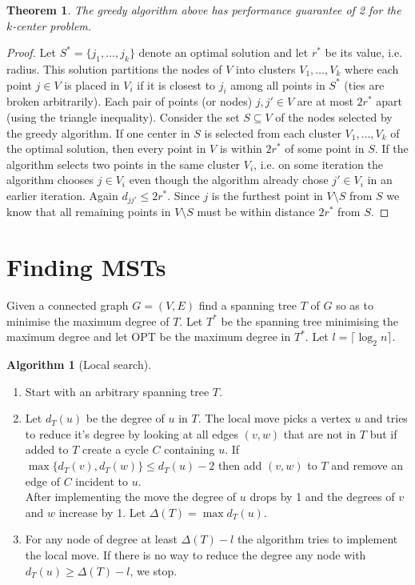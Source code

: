 \documentclass{article}
\newtheorem*{thm}{Theorem}
\theoremstyle{definition}
\newtheorem*{alg}{Algorithm}
\begin{document}
\begin{thm}
The greedy algorithm above has performance guarantee of 2 for the $k$-center problem.
\end{thm}
\begin{proof}
Let $S^*=\{j_1,\ldots,j_k\}$ denote an optimal solution and let $r^*$ be its value, i.e. radius.
This solution partitions the nodes of $V$ into clusters $V_1,\ldots,V_k$ where each point $j\in V$ is placed in $V_i$ if it is closest to $j_i$ among all points in $S^*$ (ties are broken arbitrarily).
Each pair of points (or nodes) $j,j'\in V$ are at most $2r^*$ apart (using the triangle inequality).
Consider the set $S\subseteq V$ of the nodes selected by the greedy algorithm.
If one center in $S$ is selected from each cluster $V_1,\ldots,V_k$ of the optimal solution, then every point in $V$ is within $2r^*$ of some point in $S$.
If the algorithm selects two points in the same cluster $V_i$, i.e. on some iteration the algorithm chooses $j\in V_i$ even though the algorithm already chose $j'\in V_i$ in an earlier iteration.
Again $d_{jj'}\le 2r^*$.
Since $j$ is the furthest point in $V\setminus S$ from $S$ we know that all remaining points in $V\setminus S$ must be within distance $2r^*$ from $S$.
\end{proof}


\section{Finding MSTs}
Given a connected graph $G=(V,E)$ find a spanning tree $T$ of $G$ so as to minimise the maximum degree of $T$.
Let $T^*$ be the spanning tree minimising the maximum degree and let OPT be the maximum degree in $T^*$.
Let $l =\lceil \log_2n\rceil$.

\begin{alg}[Local search]~\\
\begin{enumerate}
\item Start with an arbitrary spanning tree $T$.
\item Let $d_T(u)$ be the degree of $u$ in $T$.
The local move picks a vertex $u$ and tries to reduce it's degree by looking at all edges $(v,w)$ that are not in $T$ but if added to $T$ create a cycle $C$ containing $u$.
If $\max\{d_T(v),d_T(w)\} \le d_T(u)-2$ then add $(v,w)$ to $T$ and remove an edge of $C$ incident to $u$. \\
After implementing the move the degree of $u$ drops by 1 and the degrees of $v$ and $w$ increase by 1.
Let $\Delta(T) = \max d_T(u)$.
\item For any node of degree at least $\Delta(T) - l $ the algorithm tries to implement the local move.
If there is no way to reduce the degree any node with $d_T(u)\ge \Delta(T) - l$, we stop.
\end{enumerate}
\end{alg}
\end{document}
